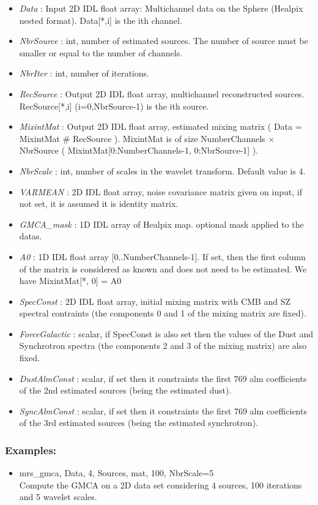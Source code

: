 \begin{itemize}
\item {\em Data} : Input 2D IDL float array: Multichannel data on the Sphere (Healpix nested format). Data[*,i] is the ith channel.
\item {\em NbrSource} : int, number of estimated sources. The number of source must be smaller or equal to the number of channels.
\item {\em NbrIter} : int, number of iterations.
\item {\em RecSource} : Output 2D IDL float array, multichannel reconstructed sources. RecSource[*,i] (i=0,NbrSource-1) is the ith source.
\item {\em MixintMat} : Output 2D IDL float array, estimated mixing matrix ( Data = MixintMat \# RecSource ). 
MixintMat is of size NumberChannels $\times$ NbrSource ( MixintMat[0:NumberChannels-1, 0:NbrSource-1] ).
\item {\em NbrScale} : int, number of scales in the wavelet transform. Default value is 4.
\item {\em VARMEAN} : 2D IDL float array, noise covariance matrix given on input, if not set, it is assumed it is identity matrix.
\item {\em GMCA\_mask} : 1D IDL array of Healpix map. optional mask applied to the datas.
\item {\em A0} : 1D IDL float array [0..NumberChannels-1]. If set, then the first column of the matrix is considered as known and does not need to be estimated. We have MixintMat[*, 0] = A0
\item {\em SpecConst} : 2D IDL float array, initial mixing matrix with CMB and SZ spectral contraints (the components 0 and 1 of the mixing matrix are fixed).
\item {\em ForceGalactic} : scalar, if SpecConst is also set then the values of the Dust and Synchrotron spectra (the components 2 and 3 of the mixing matrix) are also fixed.
\item {\em DustAlmConst} : scalar, if set then it constraints the first 769 alm coefficients of the 2nd estimated sources (being the estimated dust).
\item {\em SyncAlmConst} : scalar, if set then it constraints the first 769 alm coefficients of the 3rd estimated sources (being the estimated synchrotron).
\end{itemize}

\subsubsection*{Examples:} 
\begin{itemize}
\item mrs\_gmca, Data, 4, Sources, mat, 100, NbrScale=5 \\
Compute the GMCA on a 2D data set considering 4 sources, 100 iterations and 5 wavelet scales.
\end{itemize}



